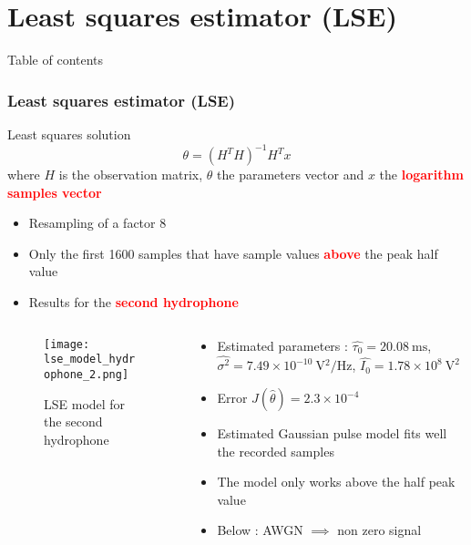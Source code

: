\documentclass[UKenglish,8pt,aspectratio=1610]{beamer}
\begin{document}
\section{Least squares estimator (LSE)}

\begin{frame}{Table of contents}
	\tableofcontents[currentsection]
\end{frame}

\begin{frame}
	\frametitle{Least squares estimator (LSE)}
	\begin{alertblock}{Least squares solution}
		\begin{equation}
			\theta = (H^TH)^{-1}H^Tx
		\end{equation} where $H$ is the observation matrix, $\theta$ the parameters vector and $x$ the  \textcolor{red}{\textbf{logarithm samples vector}}
	\end{alertblock}
	\begin{itemize}
		\item Resampling of a factor 8
		\item Only the first 1600 samples that have sample values \textcolor{red}{\textbf{above}} the peak half value
		\item Results for the  \textcolor{red}{\textbf{second hydrophone}}
	\end{itemize}
	\begin{columns}
	\begin{column}{0.5\textwidth}
		\vspace{-25pt}
		\begin{figure}[h!]
			\texttt{[image: lse\_model\_hydrophone\_2.png]}
			\centering
			\caption{LSE model for the second hydrophone}
		\end{figure}
	\end{column}
	\begin{column}{0.5\textwidth}
	\begin{itemize}
		\item Estimated parameters : $\hat{\tau_0}=20.08~\si{\milli\second}$, $\hat{\sigma^2}=7.49\times 10^{-10}~\si{\volt^2\per\hertz}$, $\hat{I_0}=1.78\times 10^8~\si{\volt}^2$
		\item Error $J(\hat{\theta})=2.3\times 10^{-4}$
		\item Estimated Gaussian pulse model fits well the recorded samples
		\item The model only works above the half peak value
		\item Below : AWGN $\implies$ non zero signal
	\end{itemize}
	\end{column}
\end{columns} 
\end{frame}
\end{document}
